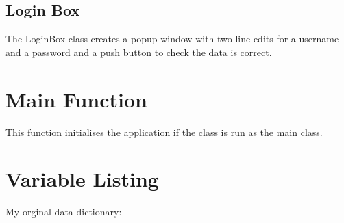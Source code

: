 \subsection{Login Box}


The LoginBox class creates a popup-window with two line edits for a username and a password and a push button to check the data is correct.


\section{Main Function}


This function initialises the application if the class is run as the main class.


\section{Variable Listing}
My orginal data dictionary:


